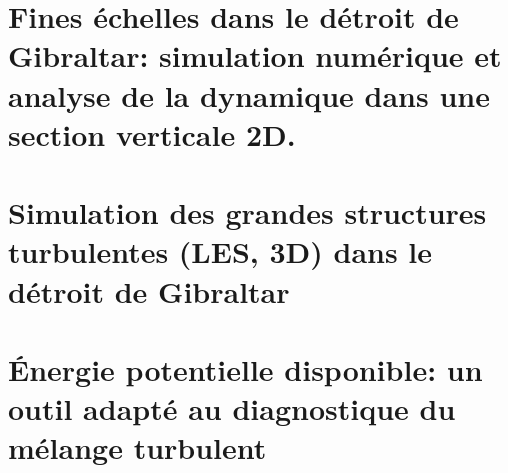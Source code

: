 \documentclass[a4paper,12pt,notitlepage,twoside]{report}
\numberwithin{equation}{section}
\begin{document}


\chapter[Fines échelles dans le détroit de Gibraltar: section verticale 2D]{Fines échelles dans le détroit de Gibraltar: simulation numérique et analyse de la dynamique dans une section verticale 2D.}
\label{chapGBR2D}


%



\chapter{Simulation des grandes structures turbulentes (LES, 3D) dans le détroit de Gibraltar}
\label{chapGBR3D}
 





\chapter{Énergie potentielle disponible: un outil adapté au diagnostique du mélange turbulent}
\label{chapBPE}
\end{document}

